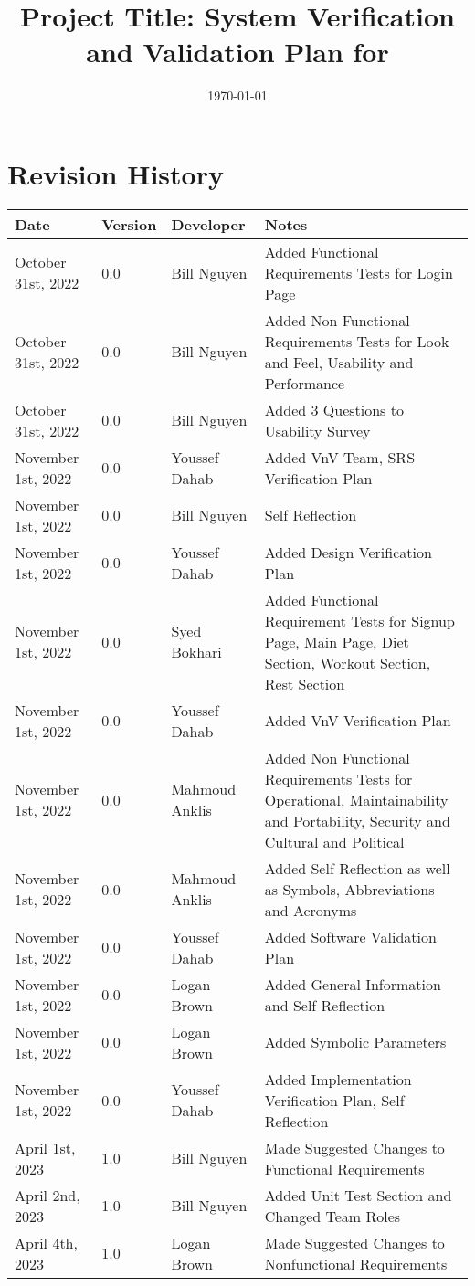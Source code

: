 \documentclass[12pt, titlepage]{article}
\begin{document}
\title{Project Title: System Verification and Validation Plan for \progname{}} 
\author{\authname}
\date{\today}

\maketitle


\section{Revision History}

\begin{tabularx}{\textwidth}{p{3cm}p{2cm}XX}
	\toprule {\bf Date} & {\bf Version} & {\bf Developer}& {\bf Notes}\\
	\midrule
	October 31st, 2022 & 0.0 & Bill Nguyen & Added Functional Requirements Tests for Login Page\\
	October 31st, 2022 & 0.0 & Bill Nguyen & Added Non Functional Requirements Tests for Look and Feel, Usability and Performance\\
	October 31st, 2022 & 0.0 & Bill Nguyen & Added 3 Questions to Usability Survey\\
	November 1st, 2022 & 0.0 & Youssef Dahab & Added VnV Team, SRS Verification Plan\\
	November 1st, 2022 & 0.0 & Bill Nguyen & Self Reflection\\
	November 1st, 2022 & 0.0 & Youssef Dahab & Added Design Verification Plan\\
	November 1st, 2022 & 0.0 & Syed Bokhari & Added Functional Requirement Tests for Signup Page, Main Page, Diet Section, Workout Section, Rest Section\\
	November 1st, 2022 & 0.0 & Youssef Dahab & Added VnV Verification Plan\\
	November 1st, 2022 & 0.0 & Mahmoud Anklis & Added Non Functional Requirements Tests for Operational, Maintainability and Portability, Security and Cultural and Political\\
	November 1st, 2022 & 0.0 & Mahmoud Anklis & Added Self Reflection as well as Symbols, Abbreviations and Acronyms\\
	November 1st, 2022 & 0.0 & Youssef Dahab & Added Software Validation Plan\\
	November 1st, 2022 & 0.0 & Logan Brown & Added General Information and Self Reflection\\
	November 1st, 2022 & 0.0 & Logan Brown & Added Symbolic Parameters\\
	November 1st, 2022 & 0.0 & Youssef Dahab & Added Implementation Verification Plan, Self Reflection\\
    April 1st, 2023 & 1.0 & Bill Nguyen & Made Suggested Changes to Functional Requirements\\
	April 2nd, 2023 & 1.0 & Bill Nguyen & Added Unit Test Section and Changed Team Roles\\
	April 4th, 2023 & 1.0 & Logan Brown & Made Suggested Changes to Nonfunctional Requirements\\
	\bottomrule
\end{tabularx}
\end{document}
